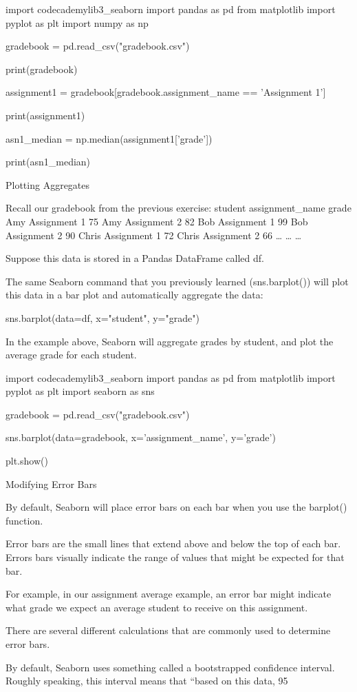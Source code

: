 \documentclass{journal}
\begin{document}
import codecademylib3_seaborn
import pandas as pd
from matplotlib import pyplot as plt
import numpy as np

gradebook = pd.read_csv("gradebook.csv")

print(gradebook)

assignment1 = gradebook[gradebook.assignment_name == 'Assignment 1']

print(assignment1)

asn1_median = np.median(assignment1['grade'])

print(asn1_median)


Plotting Aggregates

Recall our gradebook from the previous exercise:
student 	assignment_name 	grade
Amy 	Assignment 1 	75
Amy 	Assignment 2 	82
Bob 	Assignment 1 	99
Bob 	Assignment 2 	90
Chris 	Assignment 1 	72
Chris 	Assignment 2 	66
… 	… 	…

Suppose this data is stored in a Pandas DataFrame called df.

The same Seaborn command that you previously learned (sns.barplot()) will plot this data in a bar plot and automatically aggregate the data:

sns.barplot(data=df, x="student", y="grade")

In the example above, Seaborn will aggregate grades by student, and plot the average grade for each student.


import codecademylib3_seaborn
import pandas as pd
from matplotlib import pyplot as plt
import seaborn as sns

gradebook = pd.read_csv("gradebook.csv")

sns.barplot(data=gradebook, x='assignment_name', y='grade')

plt.show()


Modifying Error Bars

By default, Seaborn will place error bars on each bar when you use the barplot() function.

Error bars are the small lines that extend above and below the top of each bar. Errors bars visually indicate the range of values that might be expected for that bar.

For example, in our assignment average example, an error bar might indicate what grade we expect an average student to receive on this assignment.

There are several different calculations that are commonly used to determine error bars.

By default, Seaborn uses something called a bootstrapped confidence interval. Roughly speaking, this interval means that “based on this data, 95%
\end{document}
